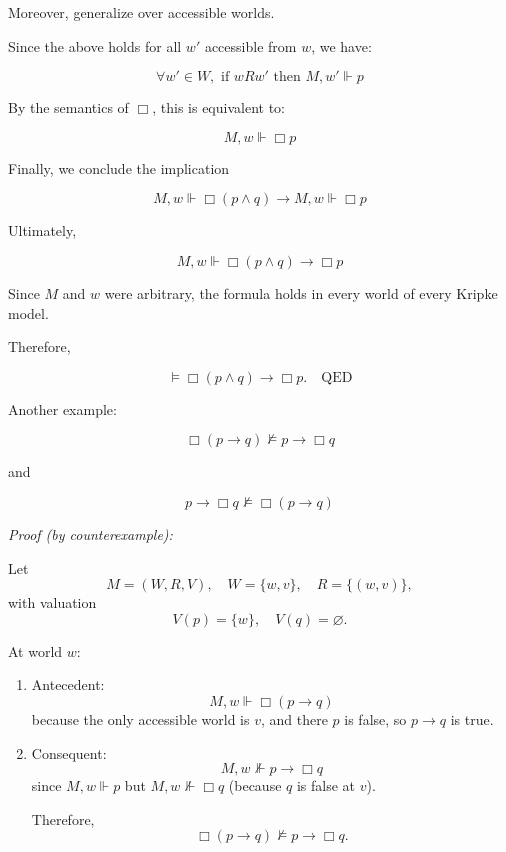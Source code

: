 \documentclass[12pt,a4paper,openany]{article}
\begin{document}
Moreover, generalize over accessible worlds.

Since the above holds for all $w'$ accessible from $w$, we have:

$$\forall w' \in W, \text{ if } w R w' \text{ then } M, w' \Vdash p$$

By the semantics of $\Box$, this is equivalent to:

$$M, w \Vdash \Box p$$

Finally, we conclude the implication

$$M, w \Vdash \Box(p \land q) \to M, w \Vdash \Box p$$

Ultimately,

$$M, w \Vdash \Box(p \land q) \to \Box p$$

Since $M$ and $w$ were arbitrary, the formula holds in every world of every Kripke model.

Therefore,

$$\models \Box(p \land q) \to \Box p. \quad \text{QED}$$

\begin{figure}[h]
\centering
{}
\end{figure}

Another example:

$$\Box(p \to q) \not\models p \to \Box q$$

and

$$p \to \Box q \not\models \Box(p \to q)$$

\textit{Proof (by counterexample):}

Let
$$M = (W,R,V), \quad W = \{w,v\}, \quad R = \{(w,v)\},$$
with valuation
$$V(p) = \{w\}, \quad V(q) = \varnothing.$$

At world $w$:

\begin{enumerate}
    \item Antecedent:
    $$M,w \Vdash \Box(p \to q)$$
    because the only accessible world is $v$, and there $p$ is false, so $p \to q$ is true.
    
    \item Consequent:
    $$M,w \not\Vdash p \to \Box q$$
    since $M,w \Vdash p$ but $M,w \not\Vdash \Box q$ (because $q$ is false at $v$).
    
    Therefore,
    $$\Box(p \to q) \not\models p \to \Box q.$$
\end{enumerate}
\end{document}
